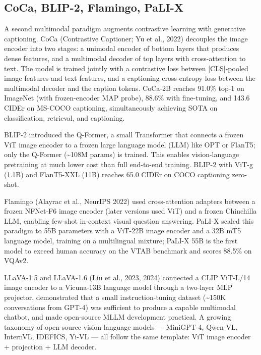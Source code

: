 \documentclass{article}
\begin{document}
\subsection{CoCa, BLIP-2, Flamingo, PaLI-X}\label{coca-blip-2-flamingo-pali-x}

A second multimodal paradigm augments contrastive learning with generative captioning. CoCa (Contrastive Captioner; Yu et al., 2022) decouples the image encoder into two stages: a unimodal encoder of bottom layers that produces dense features, and a multimodal decoder of top layers with cross-attention to text. The model is trained jointly with a contrastive loss between {[}CLS{]}-pooled image features and text features, and a captioning cross-entropy loss between the multimodal decoder and the caption tokens. CoCa-2B reaches 91.0\% top-1 on ImageNet (with frozen-encoder MAP probe), 88.6\% with fine-tuning, and 143.6 CIDEr on MS-COCO captioning, simultaneously achieving SOTA on classification, retrieval, and captioning.

BLIP-2 \citep{li2023transformerbasedvi} introduced the Q-Former, a small Transformer that connects a frozen ViT image encoder to a frozen large language model (LLM) like OPT or FlanT5; only the Q-Former (\textasciitilde108M params) is trained. This enables vision-language pretraining at much lower cost than full end-to-end training. BLIP-2 with ViT-g (1.1B) and FlanT5-XXL (11B) reaches 65.0 CIDEr on COCO captioning zero-shot.

Flamingo (Alayrac et al., NeurIPS 2022) used cross-attention adapters between a frozen NFNet-F6 image encoder (later versions used ViT) and a frozen Chinchilla LLM, enabling few-shot in-context visual question answering. PaLI-X \citep{chen2023palixonscalingupam} scaled this paradigm to 55B parameters with a ViT-22B image encoder and a 32B mT5 language model, training on a multilingual mixture; PaLI-X 55B is the first model to exceed human accuracy on the VTAB benchmark and scores 88.5\% on VQAv2.

LLaVA-1.5 and LLaVA-1.6 (Liu et al., 2023, 2024) connected a CLIP ViT-L/14 image encoder to a Vicuna-13B language model through a two-layer MLP projector, demonstrated that a small instruction-tuning dataset (\textasciitilde150K conversations from GPT-4) was sufficient to produce a capable multimodal chatbot, and made open-source MLLM development practical. A growing taxonomy of open-source vision-language models --- MiniGPT-4, Qwen-VL, InternVL, IDEFICS, Yi-VL --- all follow the same template: ViT image encoder + projection + LLM decoder.
\end{document}
